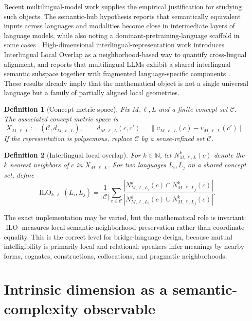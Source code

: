 \documentclass[11pt]{article}
\newtheorem{definition}{Definition}[section]
\newcommand{\Concept}{\mathcal C}
\newcommand{\ILO}{\operatorname{ILO}}
\newcommand{\N}{\mathbb N}
\begin{document}
Recent multilingual-model work supplies the empirical justification for studying such objects.  The semantic-hub hypothesis reports that semantically equivalent inputs across languages and modalities become close in intermediate layers of language models, while also noting a dominant-pretraining-language scaffold in some cases \cite{WuSemanticHub2024}.  High-dimensional interlingual-representation work introduces Interlingual Local Overlap as a neighborhood-based way to quantify cross-lingual alignment, and reports that multilingual LLMs exhibit a shared interlingual semantic subspace together with fragmented language-specific components \cite{WilieInterlingual2025}.  These results already imply that the mathematical object is not a single universal language but a family of partially aligned local geometries.

\begin{definition}[Concept metric space]
Fix $M,\ell,L$ and a finite concept set $\Concept$.  The associated concept metric space is
\[
  X_{M,\ell,L}:=(\Concept,d_{M,\ell,L}),\qquad
  d_{M,\ell,L}(c,c')=\|v_{M,\ell,L}(c)-v_{M,\ell,L}(c')\|.
\]
If the representation is polysemous, replace $\Concept$ by a sense-refined set $\widetilde{\Concept}$.
\end{definition}

\begin{definition}[Interlingual local overlap]
For $k\in\N$, let $N^k_{M,\ell,L}(c)$ denote the $k$ nearest neighbors of $c$ in $X_{M,\ell,L}$.  For two languages $L_i,L_j$ on a shared concept set, define
\[
  \ILO_{k,\ell}(L_i,L_j)
  =\frac1{|\Concept|}\sum_{c\in\Concept}
  \frac{|N^k_{M,\ell,L_i}(c)\cap N^k_{M,\ell,L_j}(c)|}
       {|N^k_{M,\ell,L_i}(c)\cup N^k_{M,\ell,L_j}(c)|}.
\]
\end{definition}

The exact implementation may be varied, but the mathematical role is invariant: $\ILO$ measures local semantic-neighborhood preservation rather than coordinate equality.  This is the correct level for bridge-language design, because mutual intelligibility is primarily local and relational: speakers infer meanings by nearby forms, cognates, constructions, collocations, and pragmatic neighborhoods.

\section{Intrinsic dimension as a semantic-complexity observable}
\end{document}
